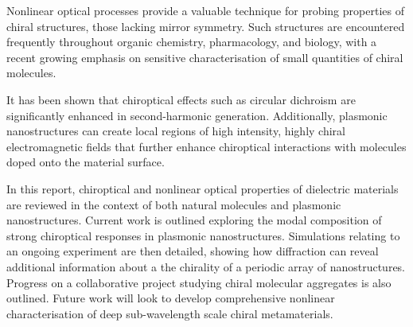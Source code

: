 Nonlinear optical processes provide a valuable technique for probing properties of chiral structures, those lacking mirror symmetry. 
Such structures are encountered frequently throughout organic chemistry, pharmacology, and biology, with a recent growing emphasis on sensitive characterisation of small quantities of chiral molecules. 
	    
It has been shown that chiroptical effects such as circular dichroism are significantly enhanced in second-harmonic generation. 
Additionally, plasmonic nanostructures can create local regions of high intensity, highly chiral electromagnetic fields that further enhance chiroptical interactions with molecules doped onto the material surface. 
	    
In this report, chiroptical and nonlinear optical properties of dielectric materials are reviewed in the context of both natural molecules and plasmonic nanostructures. 
Current work is outlined exploring the modal composition of strong chiroptical responses in plasmonic nanostructures. 
Simulations relating to an ongoing experiment are then detailed, showing how diffraction can reveal additional information about a the chirality of a periodic array of nanostructures. Progress on a collaborative project studying chiral molecular aggregates is also outlined. Future work will look to develop comprehensive nonlinear characterisation of deep sub-wavelength scale chiral metamaterials.